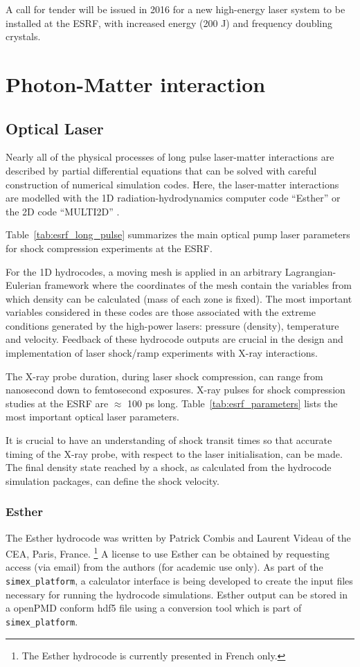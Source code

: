 \documentclass[12pt]{scrartcl}
\begin{document}
A call for tender will be issued in 2016 for a new high-energy laser system to be installed at the ESRF, with increased energy (200 J) and
frequency doubling crystals.

\section{Photon-Matter interaction}
\subsection{Optical Laser}
Nearly all of the physical processes of long pulse laser-matter interactions are described by partial differential
equations that can be solved with careful construction of numerical simulation codes. Here, the laser-matter
interactions are modelled with the 1D radiation-hydrodynamics computer code ``Esther'' \cite{Colombier2005}
or the 2D code ``MULTI2D'' \cite{Ramis2009}.

Table~\ref{tab:esrf_long_pulse} summarizes the main optical pump laser
parameters for shock compression experiments at the ESRF.

For the 1D hydrocodes, a moving mesh is applied in an arbitrary Lagrangian-Eulerian framework where the coordinates of
the mesh contain the variables from which density can be calculated (mass of
each zone is fixed). The most important variables
considered in these codes are those associated with the extreme conditions generated by the high-power lasers: pressure (density),
temperature and velocity. Feedback of these hydrocode outputs are crucial in the design and implementation of laser shock/ramp
experiments with X-ray interactions.

The X-ray probe duration, during laser shock compression, can range from nanosecond down to femtosecond exposures.
X-ray pulses for shock compression studies at the ESRF are $\approx$ 100 ps
long. Table~\ref{tab:esrf_parameters} lists the most important optical laser
parameters.

It is crucial to have an understanding of shock transit times so that accurate timing of the X-ray probe,
with respect to the laser initialisation, can be made. The final density state reached by a shock, as calculated
from the hydrocode simulation packages, can define the shock velocity.

\subsubsection{Esther}
The Esther hydrocode was written by Patrick Combis and Laurent Videau of the CEA, Paris, France.
\footnote{The Esther hydrocode is currently presented in French only.}
A license to use Esther can be obtained by requesting access (via email) from the authors (for academic use only).
As part of the \texttt{simex\_platform}, a calculator interface is being developed to create the input files necessary for running
the hydrocode simulations. Esther output can be stored in a openPMD conform hdf5
file using a conversion tool which is part of \texttt{simex\_platform}.
\end{document}
